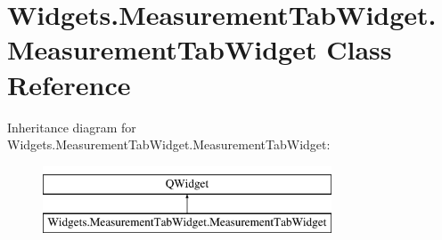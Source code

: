 \hypertarget{classWidgets_1_1MeasurementTabWidget_1_1MeasurementTabWidget}{\section{Widgets.\-Measurement\-Tab\-Widget.\-Measurement\-Tab\-Widget Class Reference}
\label{classWidgets_1_1MeasurementTabWidget_1_1MeasurementTabWidget}
}
Inheritance diagram for Widgets.\-Measurement\-Tab\-Widget.\-Measurement\-Tab\-Widget\-:\begin{figure}[H]
\begin{center}
\leavevmode
\includegraphics[height=2.000000cm]{classWidgets_1_1MeasurementTabWidget_1_1MeasurementTabWidget}
\end{center}
\end{figure}

